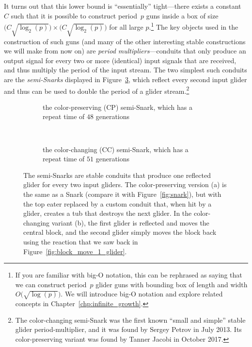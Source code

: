 It turns out that this lower bound is ``essentially'' tight---there exists a constant $C$ such that it is possible to construct period~$p$ guns inside a box of size $\big(C\sqrt{\log_2(p)}\big) \times \big(C\sqrt{\log_2(p)}\big)$ for all large $p$.\footnote{If you are familiar with big-O notation, this can be rephrased as saying that we can construct period~$p$ glider guns with bounding box of length and width $O\big(\sqrt{\log(p)}\big)$. We will introduce big-O notation and explore related concepts in Chapter~\ref{chp:infinite_growth}.} The key objects used in the construction of such guns (and many of the other interesting stable constructions we will make from now on) are \emph{period multipliers}---conduits that only produce an output signal for every two or more (identical) input signals that are received, and thus multiply the period of the input stream. The two simplest such conduits are the \emph{semi-Snarks} displayed in Figure~\ref{fig:semi_snarks}, which reflect every second input glider and thus can be used to double the period of a glider stream.\footnote{The color-changing semi-Snark was the first known ``small and simple'' stable glider period-multiplier, and it was found by Sergey Petrov in July 2013. Its color-preserving variant was found by Tanner Jacobi in October 2017.}

\begin{figure}[!htb]
	\centering
	\begin{subfigure}{\textwidth}
		\centering
		\caption{the color-preserving (CP) semi-Snark, which has a repeat time of $48$ generations}
		\label{fig:cp_semi_snark}
	\end{subfigure} \\[0.25cm]
	\begin{subfigure}{\textwidth}
		\centering
		\caption{the color-changing (CC) semi-Snark, which has a repeat time of $51$ generations}
		\label{fig:cc_semi_snark}
	\end{subfigure}
	\caption{The semi-Snarks are stable conduits that produce one reflected glider for every two input gliders. The color-preserving version (a) is the same as a Snark (compare it with Figure~\ref{fig:snark}), but with the top eater replaced by a custom conduit that, when hit by a glider, creates a tub that destroys the next glider. In the color-changing variant (b), the first glider is reflected and moves the central block, and the second glider simply moves the block back using the reaction that we saw back in Figure~\ref{fig:block_move_1_glider}.}
	\label{fig:semi_snarks}
\end{figure}

